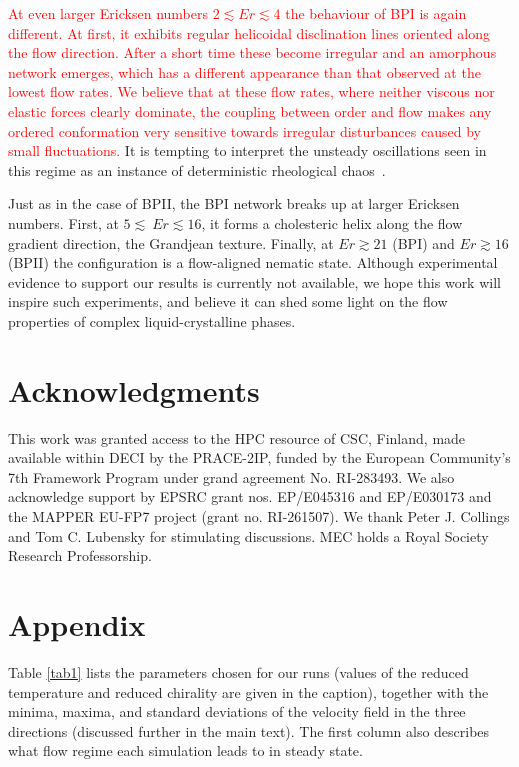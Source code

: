 \documentclass[8.5pt,twoside,twocolumn]{article}
\newcommand{\rev}[1]{{\textcolor{red}{#1}}}
\begin{document}
\rev{
At even larger Ericksen numbers $2\lesssim Er \lesssim 4$ the behaviour of BPI is again different.
At first, it exhibits regular helicoidal disclination lines oriented along the flow direction.
After a short time these become irregular and an amorphous network emerges, which has 
a different appearance than that observed at the lowest flow rates.
We believe that at these flow rates, where neither viscous nor elastic forces clearly dominate, 
the coupling between order and flow makes any ordered conformation very sensitive towards 
irregular disturbances caused by small fluctuations.
}
It is tempting to
interpret the unsteady oscillations seen in this regime as an instance of 
deterministic rheological chaos~\cite{fielding, Cates:2002}.

Just as in the case of BPII, the BPI network breaks up at larger Ericksen numbers. 
First, at $5\lesssim\ Er\lesssim 16$, it forms a cholesteric helix along the flow gradient 
direction, the Grandjean texture. Finally, at $Er\gtrsim21$ (BPI) and $Er\gtrsim16$ (BPII) the configuration
is a flow-aligned nematic state.
Although experimental evidence to support
our results is currently not available, we hope this work will inspire such experiments, 
and believe it can shed some light on the flow properties of complex liquid-crystalline phases.

\section*{Acknowledgments}

This work was granted access to the HPC resource of CSC, Finland, made available 
within DECI by the PRACE-2IP, funded by the European Community's 7th Framework 
Program under grand agreement No. RI-283493. We also acknowledge support by 
EPSRC grant nos. EP/E045316 and EP/E030173 and the MAPPER EU-FP7 project 
(grant no. RI-261507). We thank Peter J. Collings and Tom C. Lubensky for stimulating discussions. 
MEC holds a Royal Society Research Professorship.

\appendix
\section*{Appendix}

Table \ref{tab1} lists the parameters chosen for our runs (values of
the reduced temperature and reduced chirality are given in the caption),
together with the minima, maxima, and standard deviations of the velocity
field in the three directions (discussed further in the main text). 
The first column also describes what flow regime each simulation
leads to in steady state.
\end{document}
